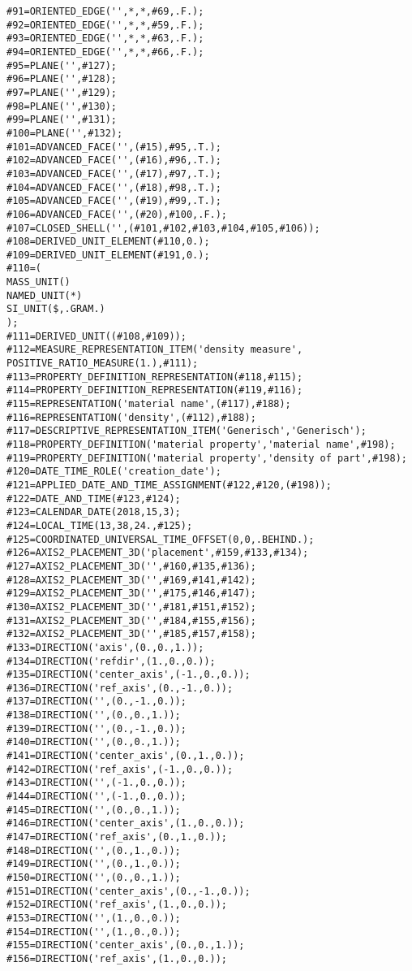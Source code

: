 \begin{lstlisting}[captionpos=b, style=customc, caption=Beschreibung eines Quaders in STEP, label=lis:simplestp]
#91=ORIENTED_EDGE('',*,*,#69,.F.);
#92=ORIENTED_EDGE('',*,*,#59,.F.);
#93=ORIENTED_EDGE('',*,*,#63,.F.);
#94=ORIENTED_EDGE('',*,*,#66,.F.);
#95=PLANE('',#127);
#96=PLANE('',#128);
#97=PLANE('',#129);
#98=PLANE('',#130);
#99=PLANE('',#131);
#100=PLANE('',#132);
#101=ADVANCED_FACE('',(#15),#95,.T.);
#102=ADVANCED_FACE('',(#16),#96,.T.);
#103=ADVANCED_FACE('',(#17),#97,.T.);
#104=ADVANCED_FACE('',(#18),#98,.T.);
#105=ADVANCED_FACE('',(#19),#99,.T.);
#106=ADVANCED_FACE('',(#20),#100,.F.);
#107=CLOSED_SHELL('',(#101,#102,#103,#104,#105,#106));
#108=DERIVED_UNIT_ELEMENT(#110,0.);
#109=DERIVED_UNIT_ELEMENT(#191,0.);
#110=(
MASS_UNIT()
NAMED_UNIT(*)
SI_UNIT($,.GRAM.)
);
#111=DERIVED_UNIT((#108,#109));
#112=MEASURE_REPRESENTATION_ITEM('density measure',
POSITIVE_RATIO_MEASURE(1.),#111);
#113=PROPERTY_DEFINITION_REPRESENTATION(#118,#115);
#114=PROPERTY_DEFINITION_REPRESENTATION(#119,#116);
#115=REPRESENTATION('material name',(#117),#188);
#116=REPRESENTATION('density',(#112),#188);
#117=DESCRIPTIVE_REPRESENTATION_ITEM('Generisch','Generisch');
#118=PROPERTY_DEFINITION('material property','material name',#198);
#119=PROPERTY_DEFINITION('material property','density of part',#198);
#120=DATE_TIME_ROLE('creation_date');
#121=APPLIED_DATE_AND_TIME_ASSIGNMENT(#122,#120,(#198));
#122=DATE_AND_TIME(#123,#124);
#123=CALENDAR_DATE(2018,15,3);
#124=LOCAL_TIME(13,38,24.,#125);
#125=COORDINATED_UNIVERSAL_TIME_OFFSET(0,0,.BEHIND.);
#126=AXIS2_PLACEMENT_3D('placement',#159,#133,#134);
#127=AXIS2_PLACEMENT_3D('',#160,#135,#136);
#128=AXIS2_PLACEMENT_3D('',#169,#141,#142);
#129=AXIS2_PLACEMENT_3D('',#175,#146,#147);
#130=AXIS2_PLACEMENT_3D('',#181,#151,#152);
#131=AXIS2_PLACEMENT_3D('',#184,#155,#156);
#132=AXIS2_PLACEMENT_3D('',#185,#157,#158);
#133=DIRECTION('axis',(0.,0.,1.));
#134=DIRECTION('refdir',(1.,0.,0.));
#135=DIRECTION('center_axis',(-1.,0.,0.));
#136=DIRECTION('ref_axis',(0.,-1.,0.));
#137=DIRECTION('',(0.,-1.,0.));
#138=DIRECTION('',(0.,0.,1.));
#139=DIRECTION('',(0.,-1.,0.));
#140=DIRECTION('',(0.,0.,1.));
#141=DIRECTION('center_axis',(0.,1.,0.));
#142=DIRECTION('ref_axis',(-1.,0.,0.));
#143=DIRECTION('',(-1.,0.,0.));
#144=DIRECTION('',(-1.,0.,0.));
#145=DIRECTION('',(0.,0.,1.));
#146=DIRECTION('center_axis',(1.,0.,0.));
#147=DIRECTION('ref_axis',(0.,1.,0.));
#148=DIRECTION('',(0.,1.,0.));
#149=DIRECTION('',(0.,1.,0.));
#150=DIRECTION('',(0.,0.,1.));
#151=DIRECTION('center_axis',(0.,-1.,0.));
#152=DIRECTION('ref_axis',(1.,0.,0.));
#153=DIRECTION('',(1.,0.,0.));
#154=DIRECTION('',(1.,0.,0.));
#155=DIRECTION('center_axis',(0.,0.,1.));
#156=DIRECTION('ref_axis',(1.,0.,0.));

\end{lstlisting}
